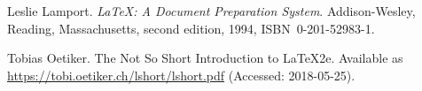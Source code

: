 

\begin{thebibliography}{99}
 Leslie Lamport.
   \newblock \emph{{\LaTeX:} A Document Preparation System}.
   \newblock Addison-Wesley, Reading, Massachusetts, second edition, 1994, ISBN~0-201-52983-1.

 Tobias Oetiker.
   \newblock The Not So Short Introduction to \LaTeX2e.
   \newblock Available as \url{https://tobi.oetiker.ch/lshort/lshort.pdf} (Accessed: 2018-05-25).

\end{thebibliography}
\backmatter

